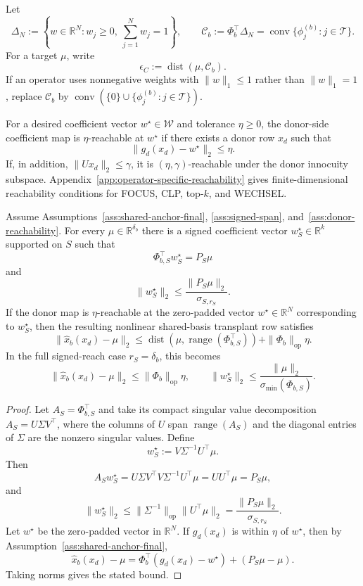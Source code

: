 \begin{assumption}
\label{ass:convex-cover}
Let
\[
\Delta_N:=\left\{w\in\mathbb{R}^N:w_j\ge 0,\ \sum_{j=1}^N w_j=1\right\},
\qquad
\mathcal{C}_b:=\Phi_b^\top\Delta_N
=
\operatorname{conv}\{\phi_j^{(b)}:j\in\mathcal{T}\}.
\]
For a target $\mu$, write
\[
\epsilon_C:=\operatorname{dist}(\mu,\mathcal{C}_b).
\]
If an operator uses nonnegative weights with $\|w\|_1\le 1$ rather than $\|w\|_1=1$, replace $\mathcal{C}_b$ by $\operatorname{conv}(\{0\}\cup\{\phi_j^{(b)}:j\in\mathcal{T}\})$.
\end{assumption}

\begin{assumption}
\label{ass:donor-reachability}
For a desired coefficient vector $w^\star\in\mathcal{W}$ and tolerance $\eta\ge 0$, the donor-side coefficient map is $\eta$-reachable at $w^\star$ if there exists a donor row $x_d$ such that
\[
\|g_d(x_d)-w^\star\|_2\le \eta.
\]
If, in addition, $\|Ux_d\|_2\le\gamma$, it is $(\eta,\gamma)$-reachable under the donor innocuity subspace. Appendix~\ref{app:operator-specific-reachability} gives finite-dimensional reachability conditions for FOCUS, CLP, top-$k$, and WECHSEL.
\end{assumption}

\begin{theorem}
\label{thm:signed-anchor-representation}
Assume Assumptions~\ref{ass:shared-anchor-final}, \ref{ass:signed-span}, and~\ref{ass:donor-reachability}. For every $\mu\in\mathbb{R}^{\delta_b}$ there is a signed coefficient vector $w_S^\star\in\mathbb{R}^{k}$ supported on $S$ such that
\[
\Phi_{b,S}^\top w_S^\star=P_S\mu
\]
and
\[
\|w_S^\star\|_2
\le
\frac{\|P_S\mu\|_2}{\sigma_{S,r_S}}.
\]
If the donor map is $\eta$-reachable at the zero-padded vector $w^\star\in\mathbb{R}^N$ corresponding to $w_S^\star$, then the resulting nonlinear shared-basis transplant row satisfies
\[
\|\widehat{x}_b(x_d)-\mu\|_2
\le
\operatorname{dist}(\mu,\operatorname{range}(\Phi_{b,S}^\top))
+
\|\Phi_b\|_{\mathrm{op}}\eta.
\]
In the full signed-reach case $r_S=\delta_b$, this becomes
\[
\|\widehat{x}_b(x_d)-\mu\|_2
\le
\|\Phi_b\|_{\mathrm{op}}\eta,
\qquad
\|w_S^\star\|_2
\le
\frac{\|\mu\|_2}{\sigma_{\min}(\Phi_{b,S})}.
\]
\end{theorem}

\begin{proof}
Let $A_S=\Phi_{b,S}^\top$ and take its compact singular value decomposition $A_S=U\Sigma V^\top$, where the columns of $U$ span $\operatorname{range}(A_S)$ and the diagonal entries of $\Sigma$ are the nonzero singular values. Define
\[
w_S^\star:=V\Sigma^{-1}U^\top\mu.
\]
Then
\[
A_Sw_S^\star=U\Sigma V^\top V\Sigma^{-1}U^\top\mu=UU^\top\mu=P_S\mu,
\]
and
\[
\|w_S^\star\|_2
\le
\|\Sigma^{-1}\|_{\mathrm{op}}\|U^\top\mu\|_2
=
\frac{\|P_S\mu\|_2}{\sigma_{S,r_S}}.
\]
Let $w^\star$ be the zero-padded vector in $\mathbb{R}^N$. If $g_d(x_d)$ is within $\eta$ of $w^\star$, then by Assumption~\ref{ass:shared-anchor-final},
\[
\widehat{x}_b(x_d)-\mu
=
\Phi_b^\top(g_d(x_d)-w^\star)+(P_S\mu-\mu).
\]
Taking norms gives the stated bound.
\end{proof}

